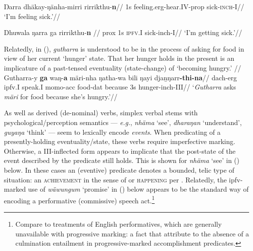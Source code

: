 \a\begingl\gla Ŋarra dhäkay-ŋänha-mirri rirrikthu-\textbf{n}//
\glb 1s feeling.\gls{erg}-hear.\gls{IV}-\gls{prop} sick-\textsc{inch}-\gls{I}//
\glft`I'm feeling sick.'\trailingcitation[DB~20190405]//\endgl


\a\begingl\gla Dhuwala ŋarra ga rirrikthu-\textbf{n}
 //
\glb  \gls{prox} 1s \textsc{ipfv.\gls{I}} sick-\gls{inch}-\gls{I}//
\glft`I'm getting sick.'\trailingcitation[DB~20190405]//\endgl

\xe
Relatedly, in (), \textit{gutharra} is understood to be in the process of asking for food in view of her current `hunger' state. That her hunger holds in the present is an implicature of a past-tensed eventuality (state-change) of `becoming hungry.'
\ex\begingl\glpreamble{}//
\gla Gutharra-y \textbf{ga} waŋ-\textbf{a} märi-nha ŋatha-wa bili ŋayi djaṉŋarr\textbf{-thi-na}//
\glb \gls{da}\gls{ch}-\gls{erg} \gls{ipfv}.\gls{I} speak.\gls{I} \gls{mo}\gls{mo}-\gls{acc} food-\gls{dat} because 3s hunger-\gls{inch}-\gls{III}//
\glft`\textit{Gutharra} asks \textit{märi} for food because she's hungry.'\trailingcitation{[WG~20171208]\footnotemark}//\endgl\xe
{}


As well as derived (de-nominal) verbs, simplex verbal stems with psychological\slash{}perception semantics --- \textit{e.g.}, \textit{nhäma} `see', \textit{dharaŋan} `understand', \textit{guyaŋa} `think' --- seem to lexically encode \textit{events}. When predicating of a presently-holding eventuality/state, these verbs require imperfective marking. Otherwise, a \gls{III}-inflected form appears to implicate that the post-state of the event described by the predicate still holds. This is shown for \textit{nhäma} `see' in (\nextx) below. In these cases an (eventive) predicate denotes a bounded, telic type of situation: an \textsc{achievement} in the sense of \citet{Vendler1957} or \textsc{happening} per \citet{Bach1986}. Relatedly, the \gls{ipfv}-marked use of \textit{wäwungum} `promise' in () below appears to be the standard way of encoding a performative (commissive) speech act.\footnote{Compare to treatments of English performatives, which are generally unavailable with progressive marking: a fact that \citet{Condoravdi2011} attribute to the absence of a culmination entailment in progressive-marked accomplishment predicates.} %

